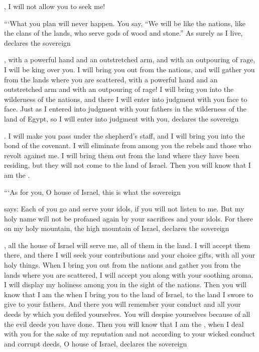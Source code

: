 {{}, I will not
allow you to seek me!
\par }{\PP {}“‘What
you plan
will never
happen.
You
say,
“We will be
like the nations,
like the clans
of the lands,
who serve
gods of wood
and stone.”
As surely
as I
live, declares
the sovereign

{}, with a powerful
hand
and an outstretched
arm,
and with an outpouring
of rage,
I will be king over you.
I will bring you out
from
the nations,
and will gather
you from
the lands
where
you are scattered,
with
a powerful
hand
and an outstretched
arm
and with
an outpouring
of rage!
I will bring
you into
the wilderness
of the nations,
and there
I will enter into judgment
with
you face
to
face.
Just
as I entered into judgment
with
your fathers
in the wilderness
of the land
of Egypt,
so
I will enter into judgment
with
you, declares
the sovereign

{}.
I will make you pass
under
the shepherd’s staff,
and I will bring
you into the bond
of the covenant.
I will eliminate
from
among
you the rebels
and those who revolt against me. I will bring
them out from
the land
where they have been residing,
but they will not
come
to
the land
of Israel.
Then you will know
that
I am
the {}.
\par }{\PP {}“‘As for you,
O house
of Israel,
this is what
the sovereign

{}
says: Each
of you go
and serve
your idols,
if
you will not
listen
to me.
But my holy
name
will not
be profaned
again
by your sacrifices
and your idols.
For there
on my holy
mountain,
the high
mountain
of Israel,
declares
the sovereign

{}, all
the house
of Israel
will serve
me, all
of them in the land.
I will accept
them there,
and there
I will seek
your contributions
and your choice
gifts,
with all
your holy things.
When I bring you out
from
the nations
and gather
you from
the lands
where
you are scattered,
I will accept
you along with your soothing
aroma.
I will display my holiness among
you in the sight
of the nations.
Then you will know
that
I am
the {}
when I bring
you to
the land
of Israel,
to
the land
I swore
to give
to your fathers.
And there
you will remember
your conduct
and all
your deeds
by which
you defiled
yourselves. You will despise
yourselves because of all
the evil
deeds you have
done.
Then you will know
that
I am
the {}, when I deal
with
you for the sake
of my reputation
and not
according to your wicked
conduct
and corrupt
deeds,
O house
of Israel,
declares
the sovereign

}
